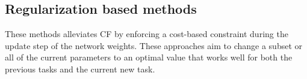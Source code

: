 \documentclass[11pt,a4paper]{article}
\begin{document}
\subsection{Regularization based methods}
These methods alleviates CF by enforcing a cost-based constraint during the update step of the network weights. These approaches aim to change a subset or all of the current parameters to an optimal value that works well for both the previous tasks and the current new task.





\end{document}
